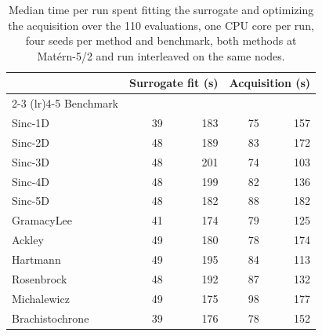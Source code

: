 \begin{table}[t]
\centering
\caption{Median time per run spent fitting the surrogate and optimizing the acquisition over the 110 evaluations, one CPU core per run, four seeds per method and benchmark, both methods at Mat\'ern-5/2 and run interleaved on the same nodes.}
\label{tab:cost}
\footnotesize
\begin{tabular}{lrrrr}
\toprule
 & \multicolumn{2}{c}{Surrogate fit (s)} & \multicolumn{2}{c}{Acquisition (s)} \\
\cmidrule(lr){2-3} \cmidrule(lr){4-5}
Benchmark & \lzero{} & \method{} & \lzero{} & \method{} \\
\midrule
Sinc-1D & 39 & 183 & 75 & 157 \\
Sinc-2D & 48 & 189 & 83 & 172 \\
Sinc-3D & 48 & 201 & 74 & 103 \\
Sinc-4D & 48 & 199 & 82 & 136 \\
Sinc-5D & 48 & 182 & 88 & 182 \\
GramacyLee & 41 & 174 & 79 & 125 \\
Ackley & 49 & 180 & 78 & 174 \\
Hartmann & 49 & 195 & 84 & 113 \\
Rosenbrock & 48 & 192 & 87 & 132 \\
Michalewicz & 49 & 175 & 98 & 177 \\
Brachistochrone & 39 & 176 & 78 & 152 \\
\bottomrule
\end{tabular}
\end{table}
